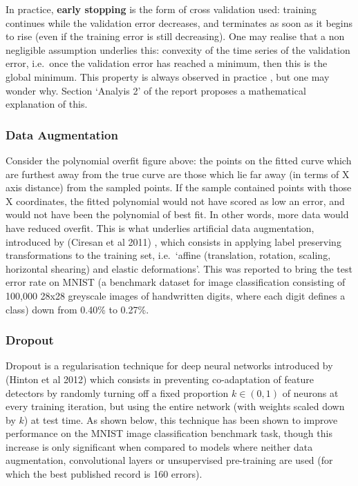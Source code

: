 \documentclass[a4paper,11pt]{article}
\begin{document}
In practice, \textbf{early stopping} is the form of cross validation used: training continues while the validation error decreases, and terminates as soon as it begins to rise (even if the training error is still decreasing). One may realise that a non negligible assumption underlies this: convexity of the time series of the validation error, i.e.\ once the validation error has reached a minimum, then this is the global minimum. This property is always observed in practice \cite{ML-book}, but one may wonder why. Section `Analyis 2' of the report proposes a mathematical explanation of this. \\

\subsubsection{Data Augmentation}

Consider the polynomial overfit figure above: the points on the fitted curve which are furthest away from the true curve are those which lie far away (in terms of X axis distance) from the sampled points. If the sample contained points with those X coordinates, the fitted polynomial would not have scored as low an error, and would not have been the polynomial of best fit. In other words, more data would have reduced overfit. This is what underlies artificial data augmentation, introduced by (Ciresan et al 2011) \cite{data-aug}, which consists in applying label preserving transformations to the training set, i.e.\ `affine (translation, rotation, scaling, horizontal shearing) and elastic deformations'. This was reported to bring the test error rate on MNIST (a benchmark dataset for image classification consisting of 100,000 28x28 greyscale images of handwritten digits, where each digit defines a class) down from 0.40\% to 0.27\%. \\

\subsubsection{Dropout}

Dropout is a regularisation technique for deep neural networks introduced by (Hinton et al 2012) \cite{dropout} which consists in preventing co-adaptation of feature detectors by randomly turning off a fixed proportion $k \in (0,1)$ of neurons at every training iteration, but using the entire network (with weights scaled down by $k$) at test time. As shown below, this technique has been shown to improve performance on the MNIST image classification benchmark task, though this increase is only significant when compared to models where neither data augmentation, convolutional layers or unsupervised pre-training are used (for which the best published record is 160 errors). \\
\end{document}
